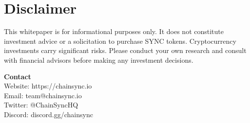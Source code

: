 \documentclass[12pt,a4paper]{article}
\begin{document}
\section{Disclaimer}

This whitepaper is for informational purposes only. It does not constitute investment advice or a solicitation to purchase SYNC tokens. Cryptocurrency investments carry significant risks. Please conduct your own research and consult with financial advisors before making any investment decisions.

\vspace{1cm}
\begin{center}
\textbf{Contact}\\
Website: https://chainsync.io\\
Email: team@chainsync.io\\
Twitter: @ChainSyncHQ\\
Discord: discord.gg/chainsync
\end{center}
\end{document}
